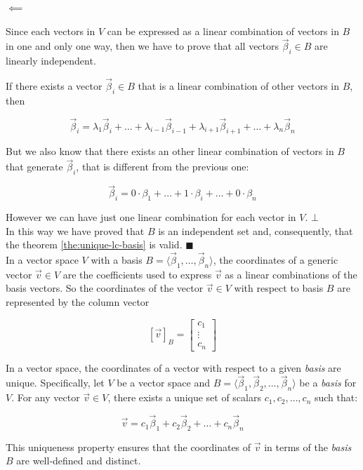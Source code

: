 $\!\impliedby$

Since each vectors in $V$ can be expressed as a linear combination of vectors in $B$ in one and only one way, then we have to prove that all vectors $\vec \beta_i \in B$ are linearly independent.

If there exists a vector $\vec \beta_i \in B$ that is a linear combination of other vectors in $B$, then

$$
\vec \beta_i = \lambda_1 \vec \beta_i + \dots + \lambda_{i-1} \vec \beta_{i-1} + \lambda_{i+1} \vec \beta_{i+1} + \dots + \lambda_n \vec \beta_n
$$

But we also know that there exists an other linear combination of vectors in $B$ that generate $\vec \beta_i$, that is different from the previous one:

$$
\vec \beta_i = 0 \cdot \beta_1 + \dots + 1 \cdot \beta_i + \dots + 0 \cdot \beta_n
$$

However we can have just one linear combination for each vector in $V$. $\bot$
\\

In this way we have proved that $B$ is an independent set and, consequently, that the theorem \ref{the:unique-lc-basis} is valid. $\blacksquare$
\\

In a vector space $V$ with a basis $B = \langle\vec \beta_1, \dots, \vec \beta_n \rangle$, the coordinates of a generic vector $\vec v \in V$ are the coefficients used to express $\vec v$ as a linear combinations of the basis vectors. So the coordinates of the vector $\vec v \in V$ with respect to basis $B$ are represented by the column vector 

$$
[\vec v]_B =\begin{bmatrix}
    c_1 \\
    \vdots\\
    c_n
\end{bmatrix}
$$



In a vector space, the coordinates of a vector with respect to a given \emph{basis} are unique. Specifically, let $V$ be a vector space and $B = \langle \vec{\beta}_1, \vec{\beta}_2, \ldots, \vec{\beta}_n\rangle$ be a \emph{basis} for $V$. For any vector $\vec{v} \in V$, there exists a unique set of scalars $c_1, c_2, \ldots, c_n$ such that:

$$
\vec{v} = c_1 \vec{\beta}_1 + c_2 \vec{\beta}_2 + \ldots + c_n \vec{\beta}_n
$$

This uniqueness property ensures that the coordinates of $\vec{v}$ in terms of the \emph{basis} $B$ are well-defined and distinct.
\\

